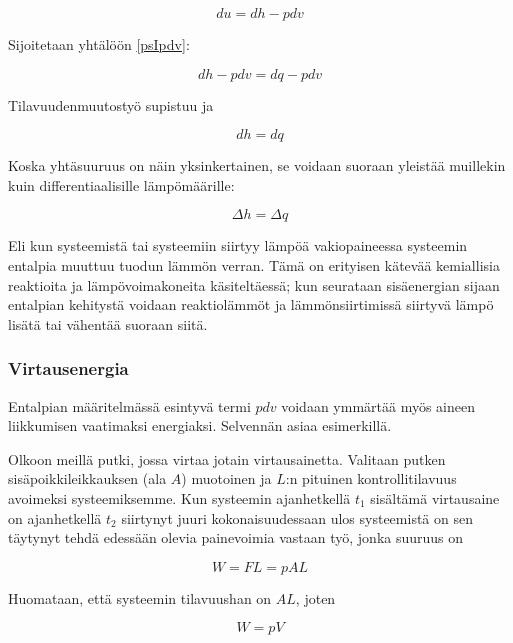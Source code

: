 \documentclass[12pt,a4paper,finnish]{book}
\begin{document}
\begin{equation}
 du = dh - pdv
\end{equation}

Sijoitetaan yhtälöön \ref{psIpdv}:

\begin{equation}
 dh - pdv = dq - pdv
\end{equation}

Tilavuudenmuutostyö supistuu ja

\begin{equation}
 dh = dq
\end{equation}

Koska yhtäsuuruus on näin yksinkertainen, se voidaan suoraan yleistää muillekin kuin differentiaalisille lämpömäärille:

\begin{equation}
 \Delta h = \Delta q
\end{equation}

Eli kun systeemistä tai systeemiin siirtyy lämpöä vakiopaineessa systeemin entalpia muuttuu tuodun lämmön verran. Tämä 
on erityisen kätevää kemiallisia reaktioita ja lämpövoimakoneita käsiteltäessä; kun seurataan sisäenergian sijaan 
entalpian kehitystä voidaan reaktiolämmöt ja lämmönsiirtimissä siirtyvä lämpö lisätä tai vähentää suoraan siitä.

\subsubsection{Virtausenergia}

Entalpian määritelmässä esintyvä termi $pdv$ voidaan ymmärtää myös aineen liikkumisen vaatimaksi energiaksi. Selvennän 
asiaa esimerkillä.

Olkoon meillä putki, jossa virtaa jotain virtausainetta. Valitaan putken sisäpoikkileikkauksen (ala $A$) muotoinen ja $L$:n 
pituinen kontrollitilavuus avoimeksi systeemiksemme. Kun systeemin ajanhetkellä $t_1$ sisältämä virtausaine on 
ajanhetkellä $t_2$ siirtynyt juuri kokonaisuudessaan ulos systeemistä on sen täytynyt tehdä edessään olevia 
painevoimia vastaan työ, jonka suuruus on

\begin{equation}
 W = FL = pAL
\end{equation}

Huomataan, että systeemin tilavuushan on $AL$, joten

\begin{equation}
 W = pV
\end{equation}
\end{document}
